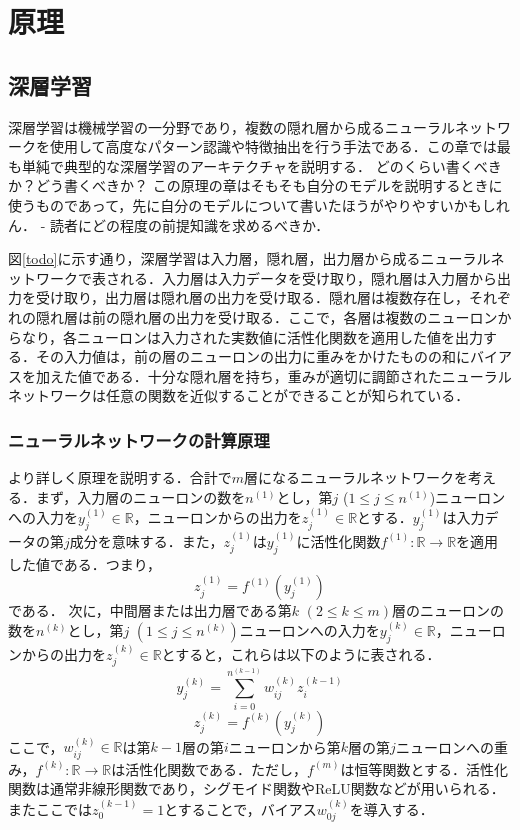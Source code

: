 \chapter{原理 \label{chap:principles}}
\section{深層学習 \label{section:deep-learning}}
深層学習は機械学習の一分野であり，複数の隠れ層から成るニューラルネットワークを使用して高度なパターン認識や特徴抽出を行う手法である．この章では最も単純で典型的な深層学習のアーキテクチャを説明する．
どのくらい書くべきか？どう書くべきか？
この原理の章はそもそも自分のモデルを説明するときに使うものであって，先に自分のモデルについて書いたほうがやりやすいかもしれん．
- 読者にどの程度の前提知識を求めるべきか．
\fi

図\ref{todo}に示す通り，深層学習は入力層，隠れ層，出力層から成るニューラルネットワークで表される．入力層は入力データを受け取り，隠れ層は入力層から出力を受け取り，出力層は隠れ層の出力を受け取る．隠れ層は複数存在し，それぞれの隠れ層は前の隠れ層の出力を受け取る．ここで，各層は複数のニューロンからなり，各ニューロンは入力された実数値に活性化関数を適用した値を出力する．その入力値は，前の層のニューロンの出力に重みをかけたものの和にバイアスを加えた値である．十分な隠れ層を持ち，重みが適切に調節されたニューラルネットワークは任意の関数を近似することができることが知られている\cite{todo}．

\subsection{ニューラルネットワークの計算原理 \label{subsection:neuron-principles}}
より詳しく原理を説明する．合計で$m$層になるニューラルネットワークを考える．まず，入力層のニューロンの数を$n^{(1)}$とし，第$j$ ($1 \leq j \leq n^{(1)}$)ニューロンへの入力を$y_j^{(1)} \in \mathbb{R}$，ニューロンからの出力を$z_j^{(1)} \in \mathbb{R}$とする．$y_j^{(1)}$は入力データの第$j$成分を意味する．また，$z_j^{(1)}$は$y_j^{(1)}$に活性化関数$f^{(1)}: \mathbb{R} \rightarrow \mathbb{R}$を適用した値である．つまり，
\begin{equation}
  z_j^{(1)} = f^{(1)}(y_j^{(1)})
  \label{eq:deep-learning-input-layer}
\end{equation}
である．
次に，中間層または出力層である第$k$ $(2 \leq k \leq m)$層のニューロンの数を$n^{(k)}$とし，第$j$ $(1 \leq j \leq n^{(k)})$ニューロンへの入力を$y_j^{(k)} \in \mathbb{R}$，ニューロンからの出力を$z_j^{(k)} \in \mathbb{R}$とすると，これらは以下のように表される．
\begin{equation}
  y_j^{(k)} = \sum_{i=0}^{n^{(k-1)}} w_{ij}^{(k)} z_i^{(k-1)}
  \label{eq:deep-learning-neuron-input}
\end{equation}
\begin{equation}
  z_j^{(k)} = f^{(k)}(y_j^{(k)})
  \label{eq:deep-learning-neuron-output}
\end{equation}
ここで，$w_{ij}^{(k)} \in \mathbb{R}$は第$k-1$層の第$i$ニューロンから第$k$層の第$j$ニューロンへの重み，$f^{(k)}: \mathbb{R} \rightarrow \mathbb{R}$は活性化関数である．ただし，$f^{(m)}$は恒等関数とする．活性化関数は通常非線形関数であり，シグモイド関数やReLU関数などが用いられる．またここでは$z_0^{(k-1)} = 1$とすることで，バイアス$w_{0j}^{(k)}$を導入する．

